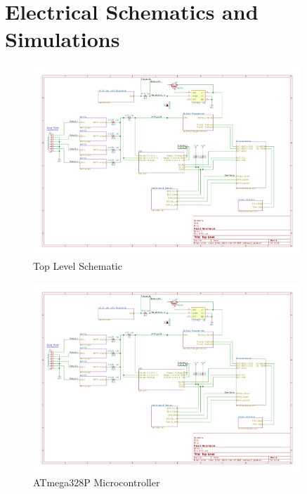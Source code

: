 \documentclass{article}
\numberwithin{figure}{section}
\numberwithin{equation}{section}
\begin{document}
{\section{Electrical Schematics and Simulations} \label{sect:appendixA}

\begin{figure}[H]
	\centering
	\includegraphics[page=1,width=0.9\textwidth]{RFCxSchematics.pdf}
	\caption{Top Level Schematic}
	\label{fig:schemp1}
\end{figure}

\begin{figure}[H]
	\centering
	\includegraphics[page=2,width=0.9\textwidth]{RFCxSchematics.pdf}
	\caption{ATmega328P Microcontroller}
	\label{fig:schemp2}
\end{figure}

}
\end{document}
